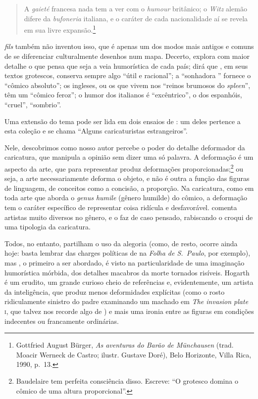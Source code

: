 \begin{quote}
A \textit{gaieté} francesa nada tem a ver com o \textit{humour}
britânico; o \textit{Witz} alemão difere da \textit{bufoneria}
italiana, e o caráter de cada nacionalidade aí se revela em sua livre
expansão.\footnote{ Gottfried August Bürger, \textit{As aventuras do
Barão de Münchausen} (trad. Moacir Werneck de Castro; ilustr. 
Gustave Doré), Belo Horizonte, Villa Rica, 1990, p.~13.}		
\end{quote}

 \textit{fils} também não inventou isso, que é apenas
um dos modos mais antigos e comuns de se diferenciar culturalmente
desenhos num mapa. Decerto,  explora com maior detalhe o que
pensa que seja a veia humorística de cada país; dirá que , em
seus textos grotescos, conserva sempre algo “útil e racional”; a
“sonhadora ” fornece o “cômico absoluto”; os ingleses, ou os
que vivem nos “reinos brumosos do \textit{spleen}”, têm um “cômico feroz”; o
humor dos italianos é “excêntrico”, o dos espanhóis, “cruel”,
“sombrio”.

Uma extensão do tema pode ser lida em dois ensaios de : um
deles pertence a esta coleção e se chama “Alguns caricaturistas
estrangeiros”.

Nele, descobrimos como nosso autor percebe o poder do detalhe deformador
da caricatura, que manipula a opinião sem dizer uma só palavra. A
deformação é um aspecto da arte, que para representar produz
deformações proporcionadas;\footnote{ Baudelaire tem perfeita
consciência disso. Escreve: “O grotesco domina o cômico de uma altura
proporcional”.} ou seja, a arte necessariamente deforma o objeto, e
não é outra a função das figuras de linguagem, de conceitos como a
concisão, a proporção. Na caricatura, como em toda arte que aborda o
\textit{genus humile} (gênero humilde) do cômico, a deformação tem o
caráter específico de representar coisa ridícula e desfavorável.
 comenta artistas muito diversos no gênero, e o faz de caso
pensado, rabiscando o croqui de uma tipologia da caricatura.

Todos, no entanto, partilham o uso da alegoria (como, de resto, ocorre
ainda hoje: basta lembrar das charges políticas de  na
\textit{Folha de S.~Paulo}, por exemplo), mas , o
primeiro a ser abordado, é visto na particularidade de uma imaginação
humorística mórbida, dos detalhes macabros da morte tornados risíveis.
Hogarth é um erudito, um grande curioso cheio de referências e,
evidentemente, um artista da inteligência, que produz menos
deformidades explícitas (como o rosto ridiculamente sinistro do padre
examinando um machado em \textit{The invasion plate} \textsc{i}, que talvez nos
recorde algo de ) e mais uma ironia entre as figuras em condições
indecentes ou francamente ordinárias.

